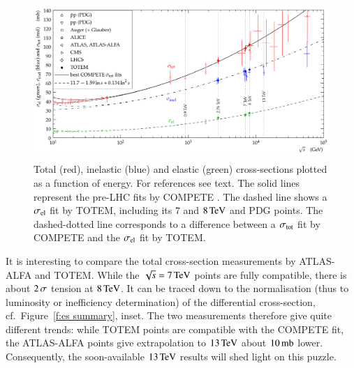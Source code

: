 \documentclass{webofc}
\def\un#1{\,{\rm #1}}
\begin{document}
\begin{figure}[h]
\centering
\includegraphics[height=6cm,clip]{fig/sigma_tot_el_inel_vs_s.pdf}
\vskip-4mm
\caption{Total (red), inelastic (blue) and elastic (green) cross-sections plotted as a function of energy. For references see text. The solid lines represent the pre-LHC fits by COMPETE \cite{compete}. The dashed line shows a $\sigma_{\rm el}$ fit by TOTEM, including its $7$ and $8\un{TeV}$ and PDG \cite{pdg} points. The dashed-dotted line corresponds to a difference between a $\sigma_{\rm tot}$ fit by COMPETE and the $\sigma_{\rm el}$ fit by TOTEM.}
\label{f:cs summary}
\end{figure}

It is interesting to compare the total cross-section measurements by ATLAS-ALFA and TOTEM. While the $\sqrt s = 7\un{TeV}$ points are fully compatible, there is about $2\un{\sigma}$ tension at $8\un{TeV}$. It can be traced down to the normalisation (thus to luminosity or inefficiency determination) of the differential cross-section, cf.~Figure~\ref{f:es summary}, inset. The two measurements therefore give quite different trends: while TOTEM points are compatible with the COMPETE fit, the ATLAS-ALFA points give extrapolation to $13\un{TeV}$ about $10\un{mb}$ lower. Consequently, the soon-available $13\un{TeV}$ results will shed light on this puzzle.
\end{document}
